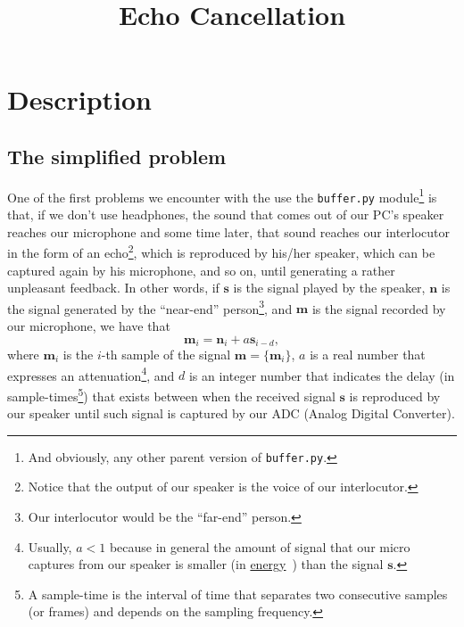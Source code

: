 
\title{Echo Cancellation}

\maketitle

\section{Description}

\subsection{The simplified problem}

One of the first problems we encounter with the use the
\texttt{buffer.py} module\footnote{And obviously, any other parent
  version of \texttt{buffer.py}.} is that, if we don't use headphones,
the sound that comes out of our PC's speaker reaches our microphone
and some time later, that sound reaches our interlocutor in the form
of an echo\footnote{Notice that the output of our speaker is the voice
  of our interlocutor.}, which is reproduced by his/her speaker, which
can be captured again by his microphone, and so on, until generating a
rather unpleasant feedback. In other words, if ${\mathbf s}$ is the
signal played by the speaker, ${\mathbf n}$ is the signal generated by
the ``near-end'' person\footnote{Our interlocutor would be the
  ``far-end'' person.}, and ${\mathbf m}$ is the signal recorded by
our microphone, we have that
\begin{equation}
   {\mathbf m}_i = {\mathbf n}_i + a{\mathbf s}_{i-d},
  \label{eq:echo_problem}
\end{equation}
where ${\mathbf m}_i$ is the $i$-th sample of the signal
${\mathbf m} = \{{\mathbf m}_i\}$, $a$ is a real number that expresses
an attenuation\footnote{Usually, $a<1$ because in general the amount
  of signal that our micro captures from our speaker is smaller (in
  \href{https://en.wikipedia.org/wiki/Energy_(signal_processing)}{energy}~\cite{vetterli2014foundations})
  than the signal ${\mathbf s}$.}, and $d$ is an integer number that
indicates the delay (in sample-times\footnote{A sample-time is the
  interval of time that separates two consecutive samples (or frames)
  and depends on the sampling frequency.}) that exists between when
the received signal ${\mathbf s}$ is reproduced by our speaker until
such signal is captured by our ADC (Analog Digital Converter).

